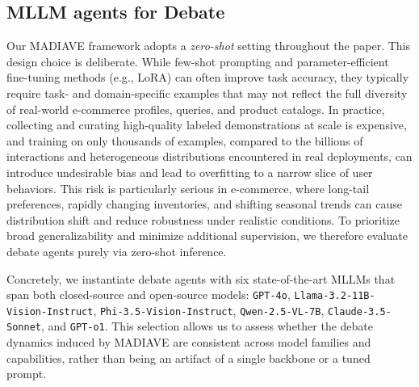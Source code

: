 \documentclass[11pt]{article}
\newcommand{\modelname}{MADIAVE}
\newcommand{\llamaname}{Llama-3.2-11B-Vision-Instruct}
\newcommand{\Qwenname}{Qwen-2.5-VL-7B}
\newcommand{\phiname}{Phi-3.5-Vision-Instruct}
\begin{document}
\subsection{MLLM agents for Debate}
\label{sec:MLLM agents for Debate}
    

Our \textsc{\modelname} framework adopts a \emph{zero-shot} setting throughout the paper. This design choice is deliberate. While few-shot prompting and parameter-efficient fine-tuning methods (e.g., LoRA) can often improve task accuracy, they typically require task- and domain-specific examples that may not reflect the full diversity of real-world e-commerce profiles, queries, and product catalogs. In practice, collecting and curating high-quality labeled demonstrations at scale is expensive, and training on only thousands of examples, compared to the billions of interactions and heterogeneous distributions encountered in real deployments, can introduce undesirable bias and lead to overfitting to a narrow slice of user behaviors. This risk is particularly serious in e-commerce, where long-tail preferences, rapidly changing inventories, and shifting seasonal trends can cause distribution shift and reduce robustness under realistic conditions. To prioritize broad generalizability and minimize additional supervision, we therefore evaluate debate agents purely via zero-shot inference.

Concretely, we instantiate debate agents with six state-of-the-art MLLMs that span both closed-source and open-source models:
\texttt{GPT-4o},
\texttt{\llamaname},
\texttt{\phiname},
\texttt{\Qwenname},
\texttt{Claude-3.5-Sonnet}, and
\texttt{GPT-o1}.
This selection allows us to assess whether the debate dynamics induced by \textsc{\modelname} are consistent across model families and capabilities, rather than being an artifact of a single backbone or a tuned prompt.
\end{document}
